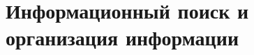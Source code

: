 \documentclass[discrete.tex]{subfiles}
\begin{document}
\section{Информационный поиск и организация информации}
\end{document}
